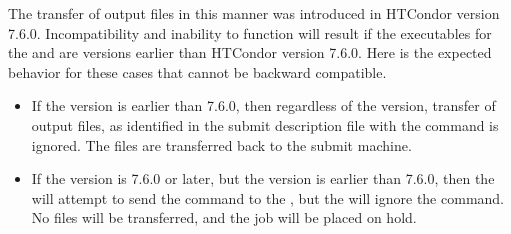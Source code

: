 The transfer of output files in this manner was introduced 
in HTCondor version 7.6.0. 
Incompatibility and inability to function will result if the executables
for the  and  are versions earlier
than HTCondor version 7.6.0.
Here is the expected behavior for these cases that 
cannot be backward compatible. 
\begin{itemize}
\item
If the  version is earlier than 7.6.0,
then regardless of the  version,
transfer of output files, as identified in the submit description
file with the command  is ignored.
The files are transferred back to the submit machine.
\item
If the  version is 7.6.0 or later,
but the   version is earlier than 7.6.0,
then the  will attempt to send the command to the
, but the  will ignore the command.
No files will be transferred, and the job will be placed on hold.
\end{itemize}
